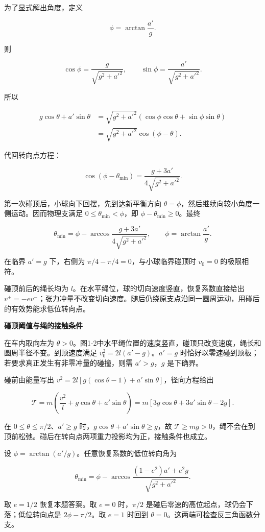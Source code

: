 \documentclass[12pt,a4paper,UTF8]{ctexart}
\begin{document}
为了显式解出角度，定义

\[\phi=\arctan\frac{a'}g.\]

则

\[\cos\phi=\frac g{\sqrt{g^2+a'^2}},\qquad
\sin\phi=\frac{a'}{\sqrt{g^2+a'^2}}.\]

所以

\[\begin{aligned}
g\cos\theta+a'\sin\theta
&=\sqrt{g^2+a'^2}
\left(\cos\phi\cos\theta+\sin\phi\sin\theta\right)\\
&=\sqrt{g^2+a'^2}\cos(\phi-\theta).
\end{aligned}\]

代回转向点方程：

\[\cos(\phi-\theta_{\min})
=\frac{g+3a'}{4\sqrt{g^2+a'^2}}.\]

第一次碰顶后，小球向下回摆，先到达新平衡方向
\(\theta=\phi\)，然后继续向较小角度一侧运动。因而物理支满足
\(0\leq\theta_{\min}<\phi\)，即 \(\phi-\theta_{\min}\geq0\)。最终

\[\boxed{
\theta_{\min}
=\phi-\arccos\frac{g+3a'}{4\sqrt{g^2+a'^2}},
\qquad \phi=\arctan\frac{a'}g
}.\]

在临界 \(a'=g\) 下，右侧为 \(\pi/4-\pi/4=0\)，与小球临界碰顶时 \(v_0=0\)
的极限相符。

碰顶前后的绳长均为 \(l\)。在水平绳位，球的切向速度竖直，恢复系数直接给出
\(v^+=-ev^-\)；张力冲量不改变切向速度。随后仍绕原支点沿同一圆周运动，用碰后的有效势能求低位转向点。

\textbf{碰顶阈值与绳的接触条件}

在车内取向左为
\(\theta>0\)。图1-2中水平绳位置的速度竖直，碰顶只改变速度，绳长和圆周半径不变。到顶速度满足
\(v_0^2=2l(a'-g)\)。\(a'=g\)
时恰好以零速碰到顶板；若要求真正发生有非零冲量的碰撞，则需
\(a'>g\)，\(g\) 是下确界。

碰前由能量写出 \(v^2=2l[g(\cos\theta-1)+a'\sin\theta]\)，径向方程给出

\[\mathcal T=m\left(\frac{v^2}{l}+g\cos\theta+a'\sin\theta\right)
=m[3g\cos\theta+3a'\sin\theta-2g].\]

在 \(0\le\theta\le\pi/2\)、\(a'\ge g\)
时，\(g\cos\theta+a'\sin\theta\ge g\)，故
\(\mathcal T\ge mg>0\)，绳不会在到顶前松弛。碰后在转向点两项重力投影均为正，接触条件也成立。

设 \(\phi=\arctan(a'/g)\)。任意恢复系数的低位转向角为

\[\theta_{\min}=\phi-\arccos\frac{(1-e^2)a'+e^2g}{\sqrt{g^2+a'^2}}.\]

取 \(e=1/2\) 恢复本题答案。取 \(e=0\) 时，\(\pi/2\)
是碰后零速的高位起点，球仍会下落；低位转向点是 \(2\phi-\pi/2\)。取
\(e=1\) 时回到 \(\theta=0\)。这两端可检查反三角函数分支。
\end{document}

